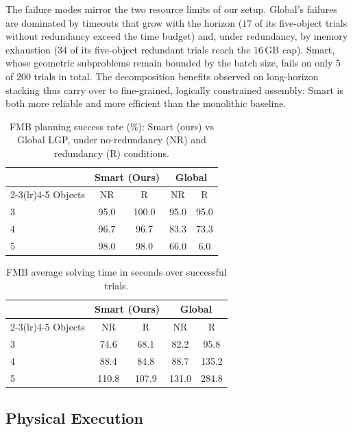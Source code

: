 \documentclass[journal]{IEEEtran}
\begin{document}
The failure modes mirror the two resource limits of our setup. Global's
failures are dominated by timeouts that grow with the horizon ($17$ of its
five-object trials without redundancy exceed the time budget) and, under
redundancy, by memory exhaustion ($34$ of its five-object redundant trials
reach the $16$\,GB cap). Smart, whose geometric subproblems remain bounded by
the batch size, fails on only $5$ of $200$ trials in total. The decomposition
benefits observed on long-horizon stacking thus carry over to fine-grained,
logically constrained assembly: Smart is both more reliable and more efficient
than the monolithic baseline.

\begin{table}[!t]
\centering
\caption{FMB planning success rate (\%): Smart (ours) vs Global LGP, under
no-redundancy (NR) and redundancy (R) conditions.}
\label{tab:fmb_sr}
\begin{tabular}{lcccc}
\toprule
 & \multicolumn{2}{c}{Smart (Ours)} & \multicolumn{2}{c}{Global} \\
\cmidrule(lr){2-3}\cmidrule(lr){4-5}
Objects & NR & R & NR & R \\
\midrule
3 & \phantom{0}95.0 & 100.0 & \phantom{0}95.0 & 95.0 \\
4 & \phantom{0}96.7 & \phantom{0}96.7 & \phantom{0}83.3 & 73.3 \\
5 & \phantom{0}98.0 & \phantom{0}98.0 & \phantom{0}66.0 & \phantom{0}6.0 \\
\bottomrule
\end{tabular}
\end{table}

\begin{table}[!t]
\centering
\caption{FMB average solving time in seconds over successful trials.}
\label{tab:fmb_time}
\begin{tabular}{lcccc}
\toprule
 & \multicolumn{2}{c}{Smart (Ours)} & \multicolumn{2}{c}{Global} \\
\cmidrule(lr){2-3}\cmidrule(lr){4-5}
Objects & NR & R & NR & R \\
\midrule
3 & \phantom{0}74.6 & \phantom{0}68.1 & \phantom{0}82.2 & \phantom{0}95.8 \\
4 & \phantom{0}88.4 & \phantom{0}84.8 & \phantom{0}88.7 & 135.2 \\
5 & 110.8 & 107.9 & 131.0 & 284.8 \\
\bottomrule
\end{tabular}
\end{table}

\subsection{Physical Execution}
\label{subsec:res_real}
\end{document}
